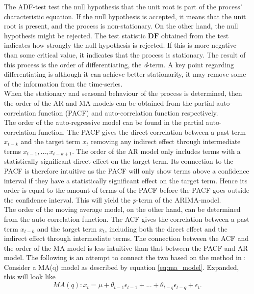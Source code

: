 The ADF-test test the null hypothesis that the unit root is part of the process' characteristic equation. If the null hypothesis is accepted, it means that the unit root is present, and the process is non-stationary. On the other hand, the null hypothesis might be rejected. The test statistic $\mathbf{DF}$ obtained from the test indicates how strongly the null hypothesis is rejected. If this is more negative than some critical value, it indicates that the process is stationary. The result of this process is the order of differentiating, the \textit{d}-term. A key point regarding differentiating is although it can achieve better stationarity, it may remove some of the information from the time-series.\\

When the stationary and seasonal behaviour of the process is determined, then the order of the AR and MA models can be obtained from the partial auto-correlation function (PACF) and auto-correlation function respectively.\cite{Zuleta-Elles2021-qh}\\

The order of the auto-regressive model can be found in the partial auto-correlation function. The PACF gives the direct correlation between a past term $x_{t-k}$ and the target term $x_t$ removing any indirect effect through intermediate terms $x_{t-1},..., x_{t-k+1}$. The order of the AR model only includes terms with a statistically significant direct effect on the target term. Its connection to the PACF is therefore intuitive as the PACF will only show terms above a confidence interval if they have a statistically significant effect on the target term. Hence its order is equal to the amount of terms of the PACF before the PACF goes outside the confidence interval. This will yield the \textit{p}-term of the ARIMA-model.\\

The order of the moving average model, on the other hand, can be determined from the auto-correlation function. The ACF gives the correlation between a past term $x_{t-k}$ and the target term $x_t$, including both the direct effect and the indirect effect through intermediate terms. The connection between the ACF and the order of the MA-model is less intuitive than that between the PACF and AR-model. The following is an attempt to connect the two based on the method in \cite{Ritvikmath2019-np}:\\

Consider a MA(q) model as described by equation \ref{eq:ma_model}. Expanded, this will look like
\begin{equation}
    MA(q): x_t = \mu + \theta_{t-1} \epsilon_{t-1} + ... + \theta_{t-q} \epsilon_{t-q} + \epsilon_t
    \label{eq:ma_model_expanded}.
\end{equation}

